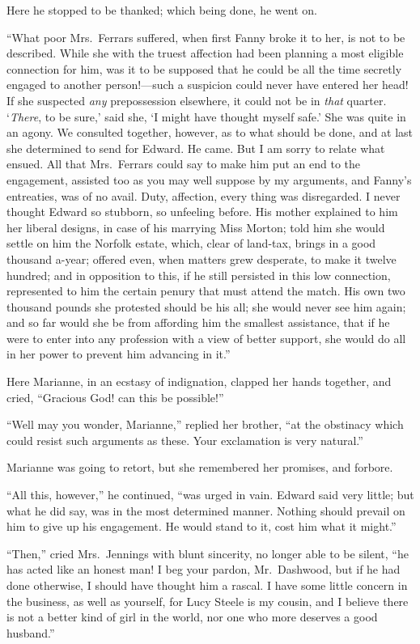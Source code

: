 \documentclass{article}
\begin{document}
Here he stopped to be thanked; which being done,
he went on.

``What poor Mrs.\ Ferrars suffered, when first Fanny
broke it to her, is not to be described.  While she with
the truest affection had been planning a most eligible
connection for him, was it to be supposed that he could
be all the time secretly engaged to another person!---such
a suspicion could never have entered her head!  If she
suspected \emph{any} prepossession elsewhere, it could not be
in \emph{that} quarter.  `\emph{There}, to be sure,' said she, `I might
have thought myself safe.' She was quite in an agony.
We consulted together, however, as to what should be done,
and at last she determined to send for Edward.
He came.  But I am sorry to relate what ensued.
All that Mrs.\ Ferrars could say to make him put an end
to the engagement, assisted too as you may well suppose
by my arguments, and Fanny's entreaties, was of
no avail.  Duty, affection, every thing was disregarded.
I never thought Edward so stubborn, so unfeeling before.
His mother explained to him her liberal designs, in case
of his marrying Miss Morton; told him she would settle on
him the Norfolk estate, which, clear of land-tax, brings
in a good thousand a-year; offered even, when matters
grew desperate, to make it twelve hundred; and in opposition
to this, if he still persisted in this low connection,
represented to him the certain penury that must attend
the match.  His own two thousand pounds she protested
should be his all; she would never see him again; and so far
would she be from affording him the smallest assistance,
that if he were to enter into any profession with a view
of better support, she would do all in her power to prevent
him advancing in it.''

Here Marianne, in an ecstasy of indignation,
clapped her hands together, and cried, ``Gracious God!
can this be possible!''

``Well may you wonder, Marianne,'' replied her brother,
``at the obstinacy which could resist such arguments as these.
Your exclamation is very natural.''

Marianne was going to retort, but she remembered
her promises, and forbore.

``All this, however,'' he continued, ``was urged in vain.
Edward said very little; but what he did say, was in
the most determined manner.  Nothing should prevail on
him to give up his engagement.  He would stand to it,
cost him what it might.''

``Then,'' cried Mrs.\ Jennings with blunt sincerity,
no longer able to be silent, ``he has acted like an honest
man! I beg your pardon, Mr.\ Dashwood, but if he had
done otherwise, I should have thought him a rascal.
I have some little concern in the business, as well
as yourself, for Lucy Steele is my cousin, and I believe
there is not a better kind of girl in the world, nor one
who more deserves a good husband.''
\end{document}
